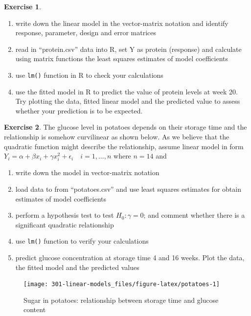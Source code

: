 \documentclass[
]{book}
\providecommand{\tightlist}{%
  \setlength{\itemsep}{0pt}\setlength{\parskip}{0pt}}
\theoremstyle{definition}
\theoremstyle{definition}
\theoremstyle{definition}
\newtheorem{exercise}{Exercise}[chapter]
\theoremstyle{remark}
\begin{document}
\begin{exercise}
\begin{enumerate}
\def\labelenumi{\alph{enumi})}
\setcounter{enumi}{2}
\tightlist
\item
  write down the linear model in the vector-matrix notation and identify response, parameter, design and error matrices
\item
  read in ``protein.csv'' data into R, set Y as protein (response) and calculate using matrix functions the least squares estimates of model coefficients
\item
  use \texttt{lm()} function in R to check your calculations
\item
  use the fitted model in R to predict the value of protein levels at week 20. Try plotting the data, fitted linear model and the predicted value to assess whether your prediction is to be expected.
\end{enumerate}
\end{exercise}

\begin{exercise}
\protect\hypertarget{exr:lm-potato}{}{\label{exr:lm-potato} }
The glucose level in potatoes depends on their storage time and the relationship is somehow curvilinear as shown below.
As we believe that the quadratic function might describe the relationship, assume linear model in form
\(Y_i = \alpha + \beta x_i + \gamma x_i^2 + \epsilon_i \quad i=1,\dots,n\) where \(n=14\) and

\begin{enumerate}
\def\labelenumi{\alph{enumi})}
\tightlist
\item
  write down the model in vector-matrix notation
\item
  load data to from ``potatoes.csv'' and use least squares estimates for obtain estimates of model coefficients
\item
  perform a hypothesis test to test \(H_0:\gamma=0\); and comment whether there is a significant quadratic relationship
\item
  use \texttt{lm()} function to verify your calculations
\item
  predict glucose concentration at storage time 4 and 16 weeks. Plot the data, the fitted model and the predicted values
\end{enumerate}
\end{exercise}

\begin{figure}

{\centering \texttt{[image: 301-linear-models\_files/figure-latex/potatoes-1]} 

}

\caption{Sugar in potatoes: relationship between storage time and glucose content}\label{fig:potatoes}
\end{figure}
\end{document}
